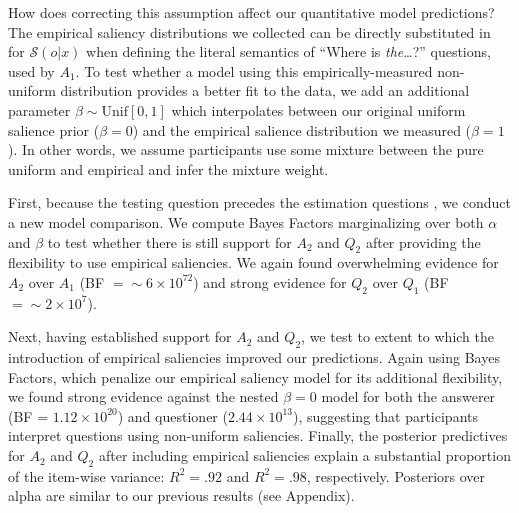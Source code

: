 \documentclass[12pt, floatsintext, jou]{apa6}
\begin{document}
How does correcting this assumption affect our quantitative model predictions? The empirical saliency distributions we collected can be directly substituted in for $\mathcal{S}(o|x)$ when defining the literal semantics of ``Where is \emph{the}\dots?'' questions, used by $A_1$. To test whether a model using this empirically-measured non-uniform distribution provides a better fit to the data, we add an additional parameter $\beta \sim \textrm{Unif}[0,1]$ which interpolates between our original uniform salience prior ($\beta = 0$) and the empirical salience distribution we measured ($\beta = 1$). In other words, we assume participants use some mixture between the pure uniform and empirical and infer the mixture weight.

First, because the testing question precedes the estimation questions \cite{Jeffreys, Simonsohn}, we conduct a new model comparison. We compute Bayes Factors marginalizing over both $\alpha$ and $\beta$ to test whether there is still support for $A_2$ and $Q_2$ after providing the flexibility to use empirical saliencies. We again found overwhelming evidence for $A_2$ over $A_1$ (BF $= \sim6 \times 10^{72}$) and strong evidence for $Q_2$ over $Q_1$ (BF $= \sim2\times 10^{7}$).

Next, having established support for $A_2$ and $Q_2$, we test to extent to which the introduction of empirical saliencies improved our predictions. Again using Bayes Factors, which penalize our empirical saliency model for its additional flexibility, we found strong evidence against the nested $\beta=0$ model for both the answerer (BF = $1.12\times 10^{20}$) and questioner ($2.44 \times 10^{13}$), suggesting that participants interpret questions using non-uniform saliencies. Finally, the posterior predictives for $A_2$ and $Q_2$ after including empirical saliencies explain a substantial proportion of the item-wise variance: $R^2 = .92$ and $R^2 = .98$, respectively. Posteriors over alpha are similar to our previous results (see Appendix).


\end{document}
